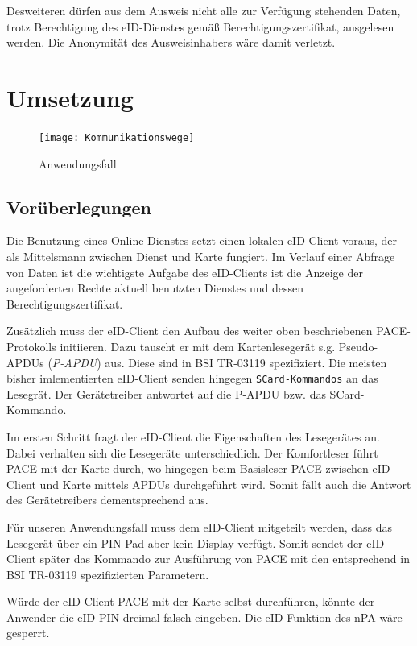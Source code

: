 \documentclass[toc=flat,fontsize=11pt,a4paper,titlepage,headsepline,numbers=noenddot, bibliography=totoc]{scrartcl}
\begin{document}
Desweiteren dürfen aus dem Ausweis nicht alle zur Verfügung stehenden Daten, trotz Berechtigung des eID-Dienstes gemäß Berechtigungszertifikat, 
ausgelesen werden. Die Anonymität des Ausweisinhabers wäre damit verletzt.  

\section{Umsetzung}

\begin{figure}[!htb]
\centering
\texttt{[image: Kommunikationswege]}
\caption{Anwendungsfall}
\label{ov}
\end{figure}

\subsection{Vorüberlegungen}

Die Benutzung eines Online-Dienstes setzt einen lokalen eID-Client voraus, der als Mittelsmann zwischen Dienst und Karte fungiert.
Im Verlauf einer Abfrage von Daten ist die wichtigste Aufgabe des eID-Clients ist die Anzeige der angeforderten Rechte aktuell benutzten Dienstes 
und dessen Berechtigungszertifikat.

Zusätzlich muss der eID-Client den Aufbau des weiter oben beschriebenen PACE-Protokolls initiieren. Dazu tauscht er mit dem Kartenlesegerät
s.g. Pseudo-APDUs (\textit{P-APDU}) aus. Diese sind in BSI TR-03119 spezifiziert. Die meisten bisher imlementierten eID-Client senden hingegen 
\verb+SCard-Kommandos+ an das Lesegrät. Der Gerätetreiber antwortet auf die P-APDU bzw. das SCard-Kommando.  

Im ersten Schritt fragt der eID-Client die Eigenschaften des Lesegerätes an. Dabei verhalten sich die Lesegeräte unterschiedlich.
Der Komfortleser führt PACE mit der Karte durch, wo hingegen beim Basisleser PACE zwischen eID-Client und
Karte mittels APDUs durchgeführt wird. Somit fällt auch die Antwort des Gerätetreibers dementsprechend aus.

Für unseren Anwendungsfall muss dem eID-Client mitgeteilt werden, dass das Lesegerät über ein PIN-Pad aber kein Display verfügt. Somit sendet der
eID-Client später das Kommando zur Ausführung von PACE mit den entsprechend in BSI TR-03119 spezifizierten Parametern.

Würde der eID-Client PACE mit der Karte selbst durchführen, könnte der Anwender die eID-PIN dreimal falsch eingeben. Die eID-Funktion des nPA
wäre gesperrt.
\end{document}
